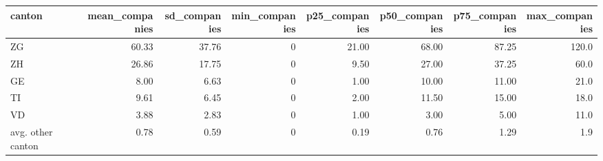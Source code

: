 \begin{tabular}{lrrrrrrr}
\toprule
           canton &  mean\_companies &  sd\_companies &  min\_companies &  p25\_companies &  p50\_companies &  p75\_companies &  max\_companies \\
\midrule
               ZG &           60.33 &         37.76 &              0 &          21.00 &          68.00 &          87.25 &          120.0 \\
               ZH &           26.86 &         17.75 &              0 &           9.50 &          27.00 &          37.25 &           60.0 \\
               GE &            8.00 &          6.63 &              0 &           1.00 &          10.00 &          11.00 &           21.0 \\
               TI &            9.61 &          6.45 &              0 &           2.00 &          11.50 &          15.00 &           18.0 \\
               VD &            3.88 &          2.83 &              0 &           1.00 &           3.00 &           5.00 &           11.0 \\
avg. other canton &            0.78 &          0.59 &              0 &           0.19 &           0.76 &           1.29 &            1.9 \\
\bottomrule
\end{tabular}
